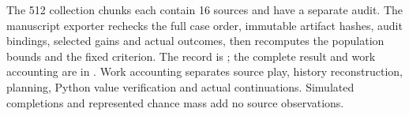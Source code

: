 The 512 collection chunks each contain 16 sources and have a separate audit.
The manuscript exporter rechecks the full case order, immutable artifact
hashes, audit bindings, selected gains and actual outcomes, then recomputes
the population bounds and the fixed criterion. The record is
; the complete result and work
accounting are in .
Work accounting separates source play, history reconstruction, planning,
Python value verification and actual continuations. Simulated completions
and represented chance mass add no source observations.
